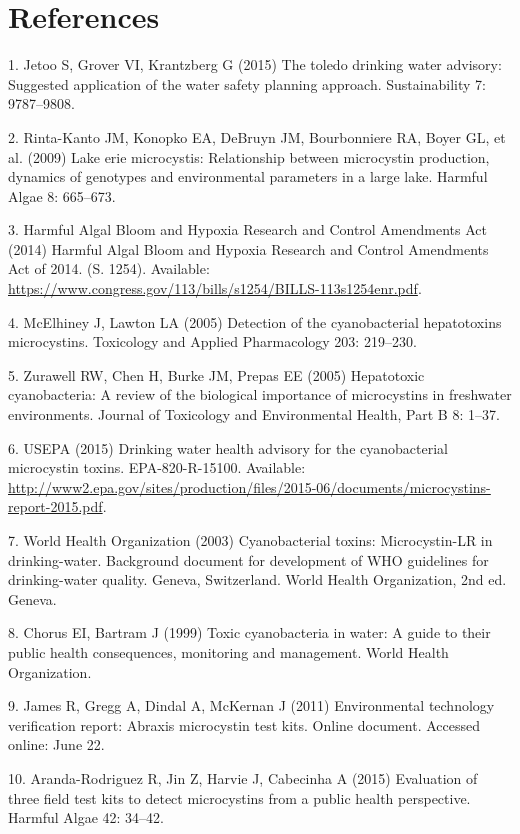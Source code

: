 \documentclass[10pt,a4paper,twocolumn]{article}
\begin{document}
\twocolumn

\section*{References}\label{references}

1. Jetoo S, Grover VI, Krantzberg G (2015) The toledo drinking water
advisory: Suggested application of the water safety planning approach.
Sustainability 7: 9787--9808.

2. Rinta-Kanto JM, Konopko EA, DeBruyn JM, Bourbonniere RA, Boyer GL, et
al. (2009) Lake erie microcystis: Relationship between microcystin
production, dynamics of genotypes and environmental parameters in a
large lake. Harmful Algae 8: 665--673.

3. Harmful Algal Bloom and Hypoxia Research and Control Amendments Act
(2014) Harmful Algal Bloom and Hypoxia Research and Control Amendments
Act of 2014. (S. 1254). Available:
\url{https://www.congress.gov/113/bills/s1254/BILLS-113s1254enr.pdf}.

4. McElhiney J, Lawton LA (2005) Detection of the cyanobacterial
hepatotoxins microcystins. Toxicology and Applied Pharmacology 203:
219--230.

5. Zurawell RW, Chen H, Burke JM, Prepas EE (2005) Hepatotoxic
cyanobacteria: A review of the biological importance of microcystins in
freshwater environments. Journal of Toxicology and Environmental Health,
Part B 8: 1--37.

6. USEPA (2015) Drinking water health advisory for the cyanobacterial
microcystin toxins. EPA-820-R-15100. Available:
\url{http://www2.epa.gov/sites/production/files/2015-06/documents/microcystins-report-2015.pdf}.

7. World Health Organization (2003) Cyanobacterial toxins:
Microcystin-LR in drinking-water. Background document for development of
WHO guidelines for drinking-water quality. Geneva, Switzerland. World
Health Organization, 2nd ed. Geneva.

8. Chorus EI, Bartram J (1999) Toxic cyanobacteria in water: A guide to
their public health consequences, monitoring and management. World
Health Organization.

9. James R, Gregg A, Dindal A, McKernan J (2011) Environmental
technology verification report: Abraxis microcystin test kits. Online
document. Accessed online: June 22.

10. Aranda-Rodriguez R, Jin Z, Harvie J, Cabecinha A (2015) Evaluation
of three field test kits to detect microcystins from a public health
perspective. Harmful Algae 42: 34--42.
\end{document}
